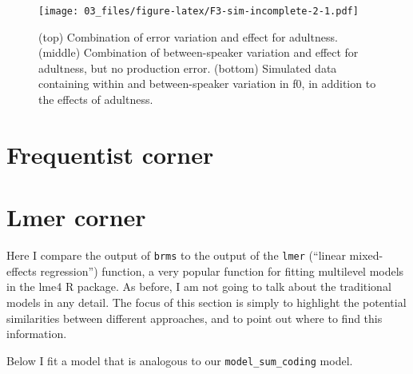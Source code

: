 \documentclass[
]{book}
\begin{document}
\begin{figure}
\centering
\texttt{[image: 03\_files/figure-latex/F3-sim-incomplete-2-1.pdf]}
\caption{\label{fig:F3-sim-incomplete-2}(top) Combination of error variation and effect for adultness. (middle) Combination of between-speaker variation and effect for adultness, but no production error. (bottom) Simulated data containing within and between-speaker variation in f0, in addition to the effects of adultness.}
\end{figure}

\hypertarget{frequentist-corner-1}{%
\section{Frequentist corner}\label{frequentist-corner-1}}

\hypertarget{lmer-corner}{%
\section{Lmer corner}\label{lmer-corner}}

Here I compare the output of \texttt{brms} to the output of the \texttt{lmer} (``linear mixed-effects regression'') function, a very popular function for fitting multilevel models in the lme4 R package. As before, I am not going to talk about the traditional models in any detail. The focus of this section is simply to highlight the potential similarities between different approaches, and to point out where to find this information.

Below I fit a model that is analogous to our \texttt{model\_sum\_coding} model.
\end{document}
